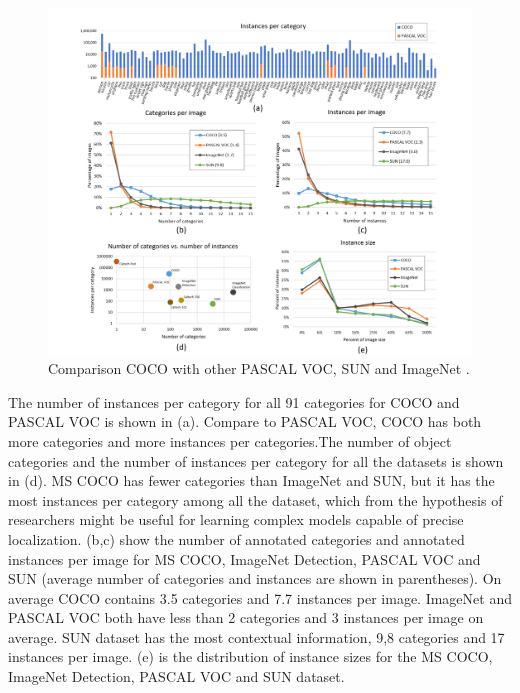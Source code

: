\documentclass[
]{krantz}
\begin{document}
\begin{figure}

{\centering \includegraphics[width=1\linewidth]{figures/02-01/2.1 coco comparison} 

}

\caption{Comparison COCO with other PASCAL VOC, SUN and ImageNet \citep{mccoco}.}\label{fig:cococomparison}
\end{figure}



The number of instances per category for all 91 categories for COCO and PASCAL VOC is shown in (a). Compare to PASCAL VOC, COCO has both more categories and more instances per categories.The number of object categories and the number of instances per category for all the datasets is shown in (d). MS COCO has fewer categories than ImageNet and SUN, but it has the most instances per category among all the dataset, which from the hypothesis of researchers might be useful for learning complex models capable of precise localization.\citep{mccoco}
(b,c) show the number of annotated categories and annotated instances per image for MS COCO, ImageNet Detection, PASCAL VOC and SUN (average number of categories and instances are shown in parentheses). On average COCO contains 3.5 categories and 7.7 instances per image. ImageNet and PASCAL VOC both have less than 2 categories and 3 instances per image on average. SUN dataset has the most contextual information, 9,8 categories and 17 instances per image.
(e) is the distribution of instance sizes for the MS COCO, ImageNet Detection, PASCAL VOC and SUN dataset.\citep{mccoco}
\end{document}
